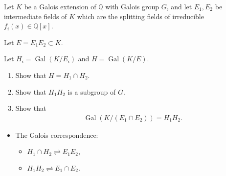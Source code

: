 Let \(K\) be a Galois extension of \({\mathbb{Q}}\) with Galois group
\(G\), and let \(E_1 , E_2\) be intermediate fields of \(K\) which are
the splitting fields of irreducible \(f_i (x) \in {\mathbb{Q}}[x]\).

Let \(E = E_1 E_2 \subset K\).

Let \(H_i = \operatorname{Gal}(K/E_i)\) and
\(H = \operatorname{Gal}(K/E)\).

\begin{enumerate}
\def\labelenumi{\alph{enumi}.}
\item
  Show that \(H = H_1 \cap H_2\).
\item
  Show that \(H_1 H_2\) is a subgroup of \(G\).
\item
  Show that
  \begin{align*}
  \operatorname{Gal}(K/(E_1 \cap E_2 )) = H_1 H_2
  .\end{align*}
\end{enumerate}

\begin{concept}

\envlist

\begin{itemize}
\tightlist
\item
  The Galois correspondence:

  \begin{itemize}
  \tightlist
  \item
    \(H_1 \cap H_2 \rightleftharpoons E_1 E_2\),
  \item
    \(H_1 H_2 \rightleftharpoons E_1 \cap E_2\).
  \end{itemize}
\end{itemize}

\end{concept}

